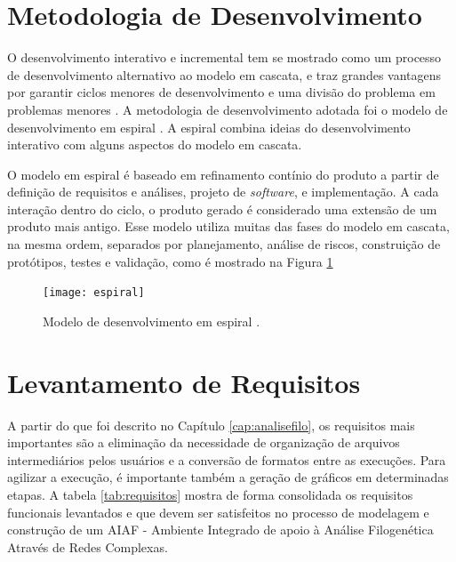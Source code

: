 
\section{Metodologia de Desenvolvimento}

O desenvolvimento interativo e incremental tem se mostrado como um processo de desenvolvimento alternativo ao modelo em cascata, e traz
grandes vantagens por garantir ciclos menores de desenvolvimento e uma divisão do problema em problemas menores \cite{softeng2005}.
A metodologia de desenvolvimento adotada
foi o modelo de desenvolvimento em espiral \cite{boehm1986}. A espiral combina ideias do desenvolvimento interativo com alguns aspectos do modelo em cascata.

O modelo em espiral é baseado em refinamento contínio do produto a partir de definição de requisitos e análises, projeto de \textit{software}, e implementação.
A cada interação dentro do ciclo, o produto gerado é considerado uma extensão de um produto mais antigo. Esse modelo utiliza muitas das fases do modelo em
cascata, na mesma ordem, separados por planejamento, análise de riscos, construição de protótipos, testes e validação, como é mostrado na Figura
\ref{fig:espiral}

\begin{figure}
\centering
\texttt{[image: espiral]}
\caption{Modelo de desenvolvimento em espiral \cite{boehm1986}.}
\label{fig:espiral}
\end{figure}

\section{Levantamento de Requisitos}

A partir do que foi descrito no Capítulo \ref{cap:analisefilo}, os requisitos mais importantes são a eliminação da necessidade de organização de arquivos
intermediários pelos usuários e a conversão de formatos entre as execuções. Para agilizar a execução, é importante também a geração de gráficos em
determinadas etapas. A tabela \ref{tab:requisitos} mostra de forma consolidada os requisitos funcionais levantados e que devem ser satisfeitos no processo de
modelagem e construção de um AIAF -
Ambiente Integrado de apoio à Análise Filogenética
Através de Redes Complexas.


